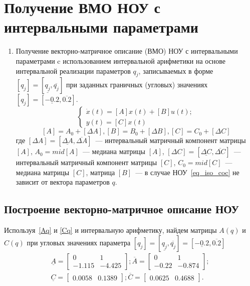 \section{Получение ВМО НОУ с интервальными параметрами}

\begin{enumerate}
	\item Получение векторно-матричное описание (ВМО) НОУ с интервальными параметрами 	c использованием интервальной арифметики на основе интервальной реализации параметров $q_j$, записываемых в форме $[q_j] = [\underline{q_j}, \overline{q_j}]$ при заданных граничных (угловых) значениях $[q_j] = [\underline{-0.2}, \overline{0.2}]$.
	\begin{equation}\label{VMO}
		\begin{cases}
			\dot x (t)  = [A] x(t) + [B] u(t);\\
			y(t) = [C] x(t)			
		\end{cases}
	\end{equation}
	\begin{equation}\label{interv}
		[A] = A_0 + [\Delta A], [B] = B_0 + [\Delta B], [C] = C_0 + [\Delta C]
	\end{equation}
	где $[\Delta A] = [\underline{\Delta A}, \overline{\Delta A}]$~--- интервальный матричный компонент матрицы $[A]$, $A_0 = mid[A]$~--- медиана матрицы $[A]$,  $[\Delta C] = [\underline{\Delta C}, \overline{\Delta C}]$~--- интервальный матричный компонент матрицы $[C]$, $C_0 = mid[C]$~--- медиана матрицы $[C]$, матрица $[B]$~--- в случае НОУ~\ref{eq_iso_coc} не зависит от вектора параметров $q$.

\end{enumerate}

\subsection{Построение векторно-матричное описание НОУ}

Используя~\ref{Aq} и \ref{Cq} и интервальную арифметику, найдем матрицы $A(q)$ и $C(q)$ при угловых значениях параметра $[q_j] = [\underline{q_j}, \overline{q_j}] = [\underline{-0.2}, \overline{0.2}]$
\begin{align}\label{Aqu}
	\underline{A} =
	\begin{bmatrix}
		0 & 1 \\
		-1.115 & -4.425
	\end{bmatrix};
	\overline{A} =
	\begin{bmatrix}
			0 & 1 \\	
			-0.22 & -0.874
	\end{bmatrix};\\
	\underline{C} =
	\begin{bmatrix}
		0.0058 & 0.1389
	\end{bmatrix};
	\overline{C} =
	\begin{bmatrix}
		0.0625 & 0.4688
	\end{bmatrix}.
\end{align}

